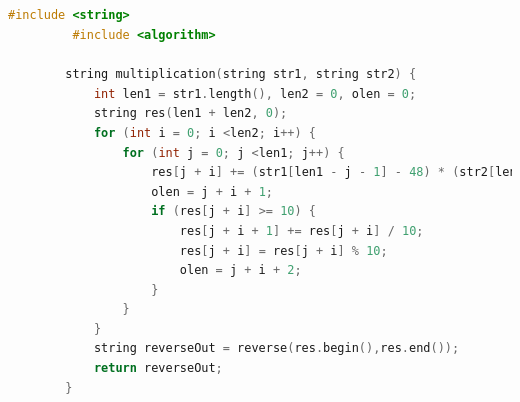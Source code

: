 \documentclass[a4paper,12pt]{report}
\begin{document}
	\subsection{}\label{subsec4:sec1:chap1}
	\begin{latin}
		\small
		\begin{lstlisting}[language=C++]
		 #include <string>
		 #include <algorithm>

		string multiplication(string str1, string str2)	{
			int len1 = str1.length(), len2 = 0, olen = 0;
			string res(len1 + len2, 0);
			for (int i = 0; i <len2; i++) {
				for (int j = 0; j <len1; j++) {
					res[j + i] += (str1[len1 - j - 1] - 48) * (str2[len2 - i - 1] - 48);
					olen = j + i + 1;
					if (res[j + i] >= 10) {
						res[j + i + 1] += res[j + i] / 10;
						res[j + i] = res[j + i] % 10;
						olen = j + i + 2;
					}
				}
			}
			string reverseOut = reverse(res.begin(),res.end());
			return reverseOut;
		}
		\end{lstlisting}
	\end{latin}

	\subsection{}\label{subsec5:sec1:chap1}


	\section{}\label{sec2:chap1}
	\subsection{}\label{subsec1:sec2:chap1}

\end{document}
